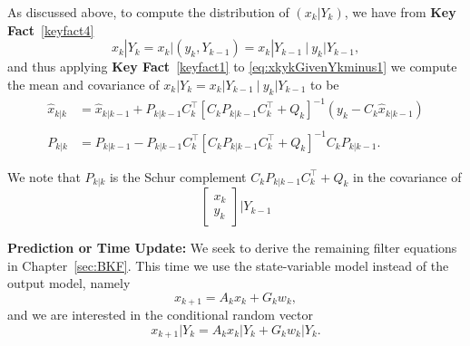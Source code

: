 As discussed above, to compute the distribution of $(x_k| Y_k)$, we have from \textbf{Key Fact}~\ref{keyfact4}
$$ x_k| Y_k = x_k\bigg| (y_k, Y_{k-1}) =  x_k|Y_{k-1} ~\bigg|~ y_k|Y_{k-1},$$
and thus applying \textbf{Key Fact}~\ref{keyfact1}  to \eqref{eq:xkykGivenYkminus1}
we compute the mean and covariance of $x_k | Y_k = x_k|Y_{k-1} ~\bigg|~ y_k|Y_{k-1}$ to be
\begin{align*}
\widehat{x}_{k|k}&=  \widehat{x}_{k|k-1} + P_{k|k-1}  C_k^\top \left[C_k P_{k|k-1} C_k^\top  + Q_k \right]^{-1} \left( y_k - C_k   \widehat{x}_{k|k-1} \right) \\
& \\
P_{k|k} &= P_{k|k-1} - P_{k|k-1} C_k^\top   \left[C_k P_{k|k-1} C_k^\top  + Q_k \right]^{-1} C_k  P_{k|k-1}.
\end{align*}

\begin{rem}We note that $P_{k|k}$ is the Schur complement $C_k P_{k|k-1} C_k^\top  + Q_k$ in the covariance of  $$ \left[ \begin{array}{c} x_k\\y_k \end{array} \right] | Y_{k-1}$$
\end{rem}




 \textbf{Prediction or Time Update:}   We seek to derive the remaining filter equations in Chapter~\ref{sec:BKF}. This time we use the state-variable model instead of the output model, namely
$$x_{k+1} = A_k x_k + G_k w_k,$$
and we are interested in the conditional random vector
$$x_{k+1} | Y_k = A_k x_k|Y_k + G_kw_k |Y_k.$$

